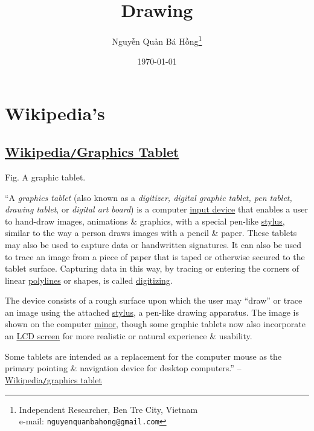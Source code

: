 \documentclass[oneside]{book}
\title{Drawing}
\author{\selectlanguage{vietnamese} Nguyễn Quản Bá Hồng\footnote{Independent Researcher, Ben Tre City, Vietnam\\e-mail: \texttt{nguyenquanbahong@gmail.com}}}
\date{\today}
\numberwithin{equation}{section}
\begin{document}
\maketitle
\setcounter{secnumdepth}{4}
\setcounter{tocdepth}{4}
\tableofcontents


\chapter{Wikipedia's}

\section{\href{https://en.wikipedia.org/wiki/Graphics_tablet}{Wikipedia\texttt{/}Graphics Tablet}}
\textsf{Fig. A graphic tablet.}

``A \textit{graphics tablet} (also known as a \textit{digitizer, digital graphic tablet, pen tablet, drawing tablet}, or \textit{digital art board}) is a computer \href{https://en.wikipedia.org/wiki/Input_device}{input device} that enables a user to hand-draw images, animations \& graphics, with a special pen-like \href{https://en.wikipedia.org/wiki/Stylus_(computing)}{stylus}, similar to the way a person draws images with a pencil \& paper. These tablets may also be used to capture data or handwritten signatures. It can also be used to trace an image from a piece of paper that is taped or otherwise secured to the tablet surface. Capturing data in this way, by tracing or entering the corners of linear \href{https://en.wikipedia.org/wiki/Polygonal_chain}{polylines} or shapes, is called \href{https://en.wikipedia.org/wiki/Digitizing}{digitizing}.

The device consists of a rough surface upon which the user may ``draw'' or trace an image using the attached \href{https://en.wikipedia.org/wiki/Stylus_(computing)}{stylus}, a pen-like drawing apparatus. The image is shown on the computer \href{https://en.wikipedia.org/wiki/Computer_display}{minor}, though some graphic tablets now also incorporate an \href{https://en.wikipedia.org/wiki/LCD_screen}{LCD screen} for more realistic or natural experience \& usability.

Some tablets are intended as a replacement for the computer mouse as the primary pointing \& navigation device for desktop computers.'' -- \href{https://en.wikipedia.org/wiki/Graphics_tablet}{Wikipedia\texttt{/}graphics tablet}
\end{document}
